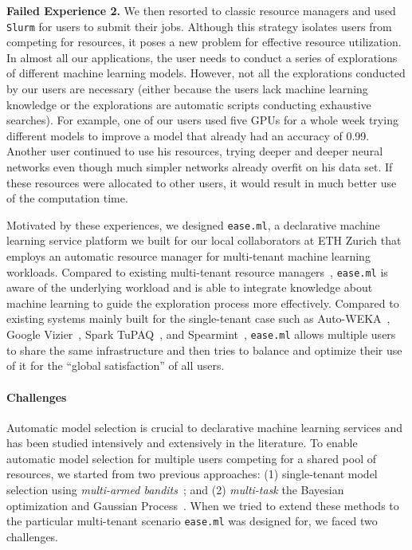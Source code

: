 \documentclass[letterpaper]{vldb}
\newcommand{\eml}{\texttt{ease.ml}\xspace}
\begin{document}
\vspace{0.3em}
\noindent
{\bf Failed Experience 2.} We then resorted to classic resource
managers and used \texttt{Slurm} for users to submit 
their jobs. 
Although this strategy isolates
users from competing for resources, it poses a
new problem for effective resource utilization.
In almost all our applications, the user needs to conduct 
a series of explorations of different machine learning
models.
However, not all the explorations conducted by
our users are necessary (either because the users lack
machine learning knowledge or the explorations are automatic 
scripts conducting exhaustive searches). For example,
one of our users used five GPUs for a whole week
trying different models to improve
a model that already had an accuracy of 0.99.
Another user 
continued to use his resources, trying deeper and 
deeper neural networks even though much simpler
networks already overfit on his data set.
If these resources were allocated to other users,
it would result in much better use of the computation time.

\vspace{0.3em}
Motivated by these experiences, we designed
\eml, a declarative machine learning service platform we built for our local collaborators at ETH Zurich
that employs an automatic resource manager for multi-tenant machine learning workloads.
Compared to existing multi-tenant 
resource managers~\cite{XXX,XXX,XXX,XXX,XXX}, \eml
is aware of the underlying workload and is able to
integrate knowledge about machine learning
to guide the exploration process more effectively.
Compared to existing systems mainly built for the
single-tenant case
such as Auto-WEKA~\cite{XXX}, 
Google Vizier~\cite{XXX}, Spark TuPAQ~\cite{XXX}, and Spearmint~\cite{XXX}, \eml allows multiple users to share the same
infrastructure and then tries to balance and optimize their use of it for
the ``global satisfaction'' of all users.

\vspace{-0.5em}
\paragraph*{Challenges}

Automatic model selection is crucial to declarative machine learning services 
and has been studied intensively and extensively in the literature.
To enable automatic model selection for multiple users
competing for a shared pool of resources,
we started from two previous approaches:
(1) single-tenant model selection using 
\emph{multi-armed bandits}~\cite{XXX,XXX,XXX};
and (2) {\em multi-task} the Bayesian optimization
and Gaussian Process~\cite{XXX,XXX,XXX}.
When we tried to extend these methods to the particular multi-tenant scenario \eml was designed for,
we faced two challenges.
\end{document}
